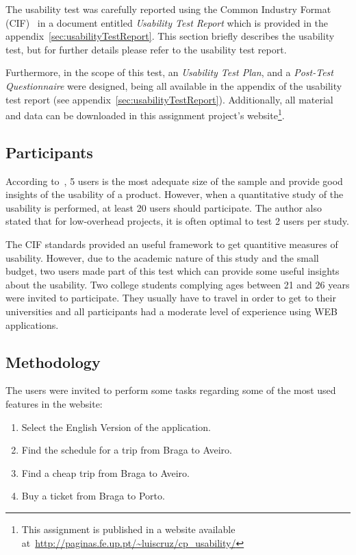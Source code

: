 \documentclass[a4paper]{article}
\begin{document}
The usability test was carefully reported using the Common Industry Format (CIF)~\citep{iusr2006cif} in a document entitled \emph{Usability Test Report} which is provided in the appendix~\ref{sec:usabilityTestReport}. This section briefly describes the usability test, but for further details please refer to the usability test report.

Furthermore, in the scope of this test, an \emph{Usability Test Plan}, and a \emph{Post-Test Questionnaire} were designed, being all available in the appendix of the usability test report (see appendix~\ref{sec:usabilityTestReport}). Additionally, all material and data can be downloaded in this assignment project's website\footnote{This assignment is published in a website available at~\url{http://paginas.fe.up.pt/~luiscruz/cp_usability/}}.

\subsection{Participants} According to~\citet{nielsen2012many}, 5 users is the most adequate size of the sample and provide good insights of the usability of a product. However, when a quantitative study of the usability is performed, at least 20 users should participate. The author also stated that for low-overhead projects, it is often optimal to test 2 users per study.

The CIF standards provided an useful framework to get quantitive measures of usability. However, due to the academic nature of this study and the small budget, two users made part of this test which can provide some useful insights about the usability. Two college students complying ages between 21 and 26 years were invited to participate. They usually have to travel in order to get to their universities and all participants had a moderate level of experience using WEB applications. 


\begin{samepage}
\subsection{Methodology} The users were invited to perform some tasks regarding some of the most used features in the website:

\begin{enumerate}
  \item Select the English Version of the application.
  \item Find the schedule for a trip from Braga to Aveiro.
  \item Find a cheap trip from Braga to Aveiro.
  \item Buy a ticket from Braga to Porto.
\end{enumerate}
\end{samepage}
\end{document}
